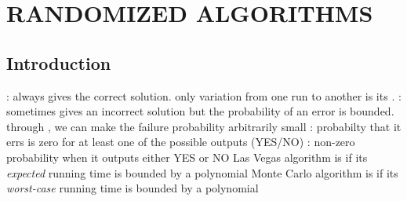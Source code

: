\section{RANDOMIZED ALGORITHMS}
\subsection{Introduction}
\bit
\w {}: always gives the correct solution.
    only variation from one run to another is its .
\w {}: sometimes gives an incorrect solution
    but the probability of an error is bounded.
   \bit
   \w through , we can make the failure probability arbitrarily
   small 
   \w {}: probabilty that it errs is
   zero for at least one of the possible outputs (YES/NO)
   \w {}: non-zero probability when it
   outputs either YES or NO
   \eit
\w Las Vegas algorithm is  if its {\em expected\/} running time
is bounded by a polynomial
\w Monte Carlo algorithm is  if its {\em worst-case\/} running
time is bounded by a polynomial
\eit
